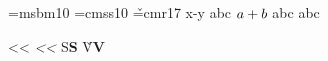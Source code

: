 \documentclass{article}
\begin{document}
\font\y=msbm10 \font\z=cmss10 \font\v=cmr17
{\tenln\normalfont x-y} {\tencirc\rmfamily abc} $\tenln a+b$
{\y\textrm{abc}} {\y\color{red}abc}

{\y\textrm{<<}} {\y\z\itshape <<} {\z S\bfseries S} {\v V\bfseries V}
\end{document}
